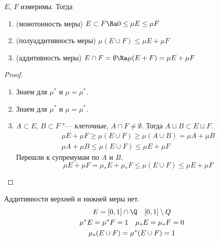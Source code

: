 \begin{theorem}
	$E$, $F$ измеримы.
	Тогда
	\begin{enumerate}
		\item (монотонность меры) $E \subset F \Ra 0 \le \mu E \le \mu F$
		\item (полуаддитивность меры) $\mu (E \cup F) \le \mu E + \mu F$
		\item (аддитивность меры) $E \cap F = \emptyset \Ra \mu(E + F) = \mu E + \mu F$
	\end{enumerate}
\end{theorem}
\begin{proof}
	\begin{enumerate}
	\item
		Знаем для $\mu^*$ и $\mu = \mu^*$.

	\item
		Знаем для $\mu^*$ и $\mu = \mu^*$.

	\item
		$A \subset E$, $B \subset F$ "--- клеточные, $A \cap F \ne \emptyset$.
		Тогда $A \sqcup B \subset E \sqcup F$.
		\begin{gather*}
			\mu E + \mu F \ge \mu(E \cup F) \ge \mu(A \cup B) = \mu A + \mu B \\
			\mu A + \mu B \le \mu (E \cup F) \le \mu E + \mu F
		\end{gather*}
		Перешли к супремумам по $A$ и $B$.
		\[
			\mu E + \mu F = \mu_* E + \mu_* F \le \mu (E \cup F) \le \mu E + \mu F
		\]
	\end{enumerate}
\end{proof}

\begin{Rem}
	Аддитивности верхней и нижней меры нет.
	\begin{gather*}
		E = [0, 1] \cap \Q \quad [0, 1] \setminus Q \\
		\mu^* E = \mu^* F = 1 \quad \mu_* E = \mu_* F = 0 \\
		\mu_*(E \cup F) = \mu^* (E \cup F) = 1
	\end{gather*}
\end{Rem}